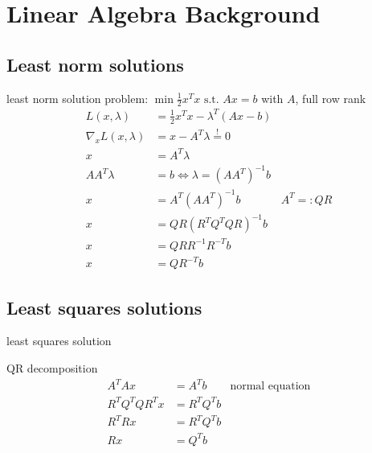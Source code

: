 \documentclass{beamer}
\begin{document}
\section{Linear Algebra Background}

\subsection{Least norm solutions}

\begin{frame} {least norm solution}
problem: \(\min \frac{1}{2} x^Tx \text{ s.t. } Ax = b\) with \(A\), full row rank
\pause
\begin{align*}
	L(x,\lambda) &= \frac{1}{2} x^Tx - \lambda^T (Ax -b)\\
	\nabla_x L(x,\lambda) &= x - A^T \lambda \stackrel{!}{=} 0\\
	x & = A^T \lambda\\
	AA^T \lambda &= b \Leftrightarrow \lambda = (AA^T)^{-1} b\\
	x &= A^T(AA^T)^{-1} b & A^T =: QR\\
	x &= QR(R^TQ^TQR)^{-1}b\\
	x &= QRR^{-1} R^{-T}b\\
	x &= QR^{-T}b
\end{align*}
\end{frame}

\subsection{Least squares solutions}

\begin{frame}{least squares solution}
\begin{block}{QR decomposition}
\begin{align*}
	A^TAx &= A^T b & \text{normal equation}\\
	R^TQ^TQR^Tx &= R^TQ^Tb\\
	R^TRx & = R^TQ^Tb\\
	Rx &= Q^T b\\
\end{align*}
\end{block}
\end{frame}
\end{document}
